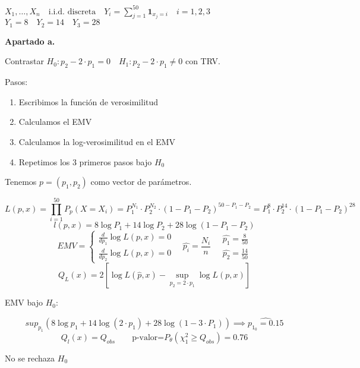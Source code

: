 \(
X_1,\dots,X_n \quad \text{i.i.d. discreta} \quad
Y_i=\sum_{j=1}^{50} \mathbf{1}_{x_j=i} \quad i=1,2,3
\)
\(
Y_1=8 \quad Y_2=14 \quad Y_3=28
\)

\textbf{Apartado a.}

Contrastar $H_0: p_2-2\cdot p_1=0 \quad H_1: p_2-2\cdot p_1 \neq 0$
con TRV.

Pasos:
\begin{enumerate}
    \item Escribimos la función de verosimilitud
    \item Calculamos el EMV
    \item Calculamos la log-verosimilitud en el EMV
    \item Repetimos los 3 primeros pasos bajo $H_0$
\end{enumerate}

Tenemos $p=(p_1,p_2)$ como vector de parámetros.

\[
L(p,x)=\prod_{i=1}^{50} P_p(X=X_i)=P_1^{N_1}\cdot P_2^{N_2}\cdot (1-P_1-P_2)^{50-P_1-P_2}=P_1^8\cdot P_2^{14} \cdot (1-P_1-P_2)^{28}
\]
\[
l(p,x)=8 \log P_1 +14 \log P_2 +28 \log (1-P_1-P_2)
\]
\[
EMV=\left\{
\begin{array}{l}
    \frac{d}{d p_1} \log L(p,x)=0\\
    \frac{d}{d p_2} \log L(p,x)=0
\end{array}
\right.
\quad \widehat{p_i}=\frac{N_i}{n}
\quad
\begin{matrix}
    \widehat{p_1}=\frac{8}{50}\\
    \widehat{p_2}=\frac{14}{50}
\end{matrix}
\]
\[
Q_L(x)=2[\log L(\widehat{p},x)-\sup_{p_2=2\cdot p_1}\log L(p,x)]
\]

EMV bajo $H_0$:

\[
sup_{p_1}(8 \log p_1 +14 \log(2\cdot p_1)+28 \log(1-3\cdot P_1))\implies \widehat{p_{1_0}=0.15}
\]
\[
Q_l(x)=Q_{obs} \qquad \text{p-valor=}P_\theta(\chi^2_1 \geq Q_{obs})=0.76
\]

No se rechaza $H_0$



